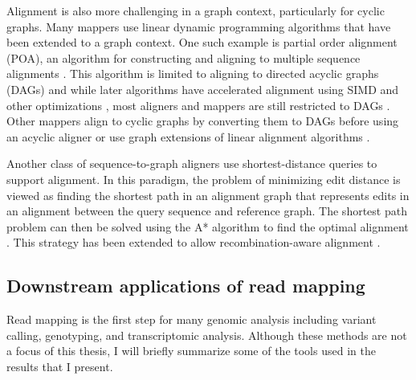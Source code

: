 \documentclass[11pt]{ucscthesis}
\begin{document}
Alignment is also more challenging in a graph context, particularly for cyclic graphs.
Many mappers use linear dynamic programming algorithms that have been extended to a graph context.
One such example is partial order alignment (POA), an algorithm for constructing and aligning to multiple sequence alignments \cite{lee_poa_2002}.
This algorithm is limited to aligning to directed acyclic graphs (DAGs) and while later algorithms have accelerated alignment using SIMD and other optimizations \cite{jain_accelerating_2019,gao_abpoa_2021,darby_vargas_2020}, most aligners and mappers are still restricted to DAGs \cite{kim_hisat2_2019,rakocevic_fast_2019,li_minigraph_2020,ma_graphchainer_2023}.
Other mappers align to cyclic graphs by converting them to DAGs before using an acyclic aligner \cite{garrison_vg_2018} or use graph extensions of linear alignment algorithms \cite{rautiainen_bit-parallel_2019,zhang_fast_2022}. 

Another class of sequence-to-graph aligners use shortest-distance queries to support alignment.
In this paradigm, the problem of minimizing edit distance is viewed as finding the shortest path in an alignment graph that represents edits in an alignment between the query sequence and reference graph.
The shortest path problem can then be solved using the A* algorithm to find the optimal alignment \cite{ivanov_astarix_2020,bonizzoni_recalign_2025}.
This strategy has been extended to allow recombination-aware alignment \cite{bonizzoni_recalign_2025}.


\subsection{Downstream applications of read mapping}

Read mapping is the first step for many genomic analysis including variant calling, genotyping, and transcriptomic analysis. 
Although these methods are not a focus of this thesis, I will briefly summarize some of the tools used in the results that I present.
\end{document}
